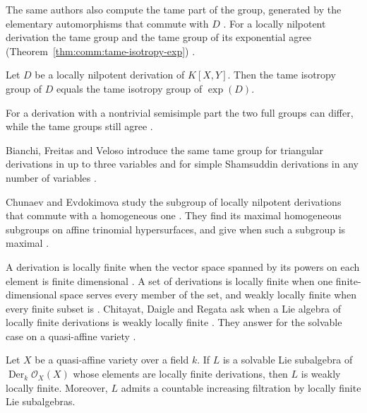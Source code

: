The same authors also compute the tame part of the group, generated by the
elementary automorphisms that commute with $D$
\cite[p.~1]{CidVeloso2026TameIsotropy}. For a locally nilpotent derivation the tame
group and the tame group of its exponential agree (Theorem~\ref{thm:comm:tame-isotropy-exp})
\cite[Proposition~4.1, p.~9]{CidVeloso2026TameIsotropy}.\begin{theorem}\label{thm:comm:tame-isotropy-exp}
Let $D$ be a locally nilpotent derivation of $K[X,Y]$. Then the tame
isotropy group of $D$ equals the tame isotropy group of
$\exp(D)$.
\end{theorem}

For a derivation with a nontrivial semisimple part the two full groups can
differ, while the tame groups still agree
\cite[pp.~1--2]{CidVeloso2026TameIsotropy}.

Bianchi, Freitas and Veloso introduce the same tame group for triangular
derivations in up to three variables and for simple Shamsuddin derivations in
any number of variables \cite[Abstract, p.~1]{BianchiFreitasVeloso2025Tame}.

Chunaev and Evdokimova study the subgroup of locally nilpotent derivations
that commute with a homogeneous one \cite[Abstract,
p.~1]{ChunaevEvdokimova2026}. They find its maximal homogeneous subgroups on
affine trinomial hypersurfaces, and give when such a subgroup is maximal
\cite[Abstract, p.~1]{ChunaevEvdokimova2026}.

A derivation is locally finite when the vector space spanned by its powers on
each element is finite dimensional
\cite[Definition~2.1, p.~2]{ChitayatDaigleRegeta2026}. A set of derivations
is locally finite when one finite-dimensional space serves every member of
the set, and weakly locally finite when every finite subset is
\cite[Definition~2.1, p.~2]{ChitayatDaigleRegeta2026}. Chitayat, Daigle and
Regata ask when a Lie algebra of locally finite derivations is weakly
locally finite \cite[pp.~1--2]{ChitayatDaigleRegeta2026}. They answer for
the solvable case on a quasi-affine variety
\cite[Corollary~4, p.~2]{ChitayatDaigleRegeta2026}.

\begin{theorem}\label{thm:comm:locally-finite-solvable}
Let $X$ be a quasi-affine variety over a field $k$. If $L$ is a solvable
Lie subalgebra of $\operatorname{Der}_k \mathcal{O}_X(X)$ whose elements
are locally finite derivations, then $L$ is weakly locally finite. Moreover,
$L$ admits a countable increasing filtration by locally finite Lie
subalgebras.
\end{theorem}

